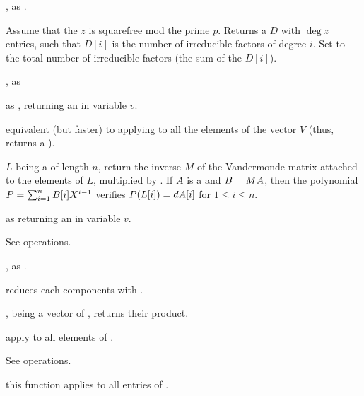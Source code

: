 , as .

 Assume
that the  $z$ is squarefree mod the prime $p$. Returns a
 $D$ with $\deg z$ entries, such that $D[i]$ is the number of
irreducible factors of degree $i$. Set  to the total number of
irreducible factors (the sum of the $D[i]$).

,\hfil\break
as 

 as ,
returning an  in variable $v$.

 equivalent (but
faster) to applying  to all the elements of the
vector $V$ (thus, returns a ).

 $L$ being a 
of length $n$, return the inverse $M$ of the Vandermonde matrix attached to
the elements of $L$, multiplied by .
If $A$ is a  and $B=M\*A$, then the polynomial
$P=\sum_{i=1}^n B[i]\*X^{i-1}$ verifies $P(L[i])=d\*A[i]$ for
$1 \leq i \leq n$.

 as
 returning an  in variable $v$.

 See  operations.

, as .

 reduces each components with .

,  being a vector of ,
returns their product.

apply  to all elements of .




 See  operations.

this function applies  to all entries of .


